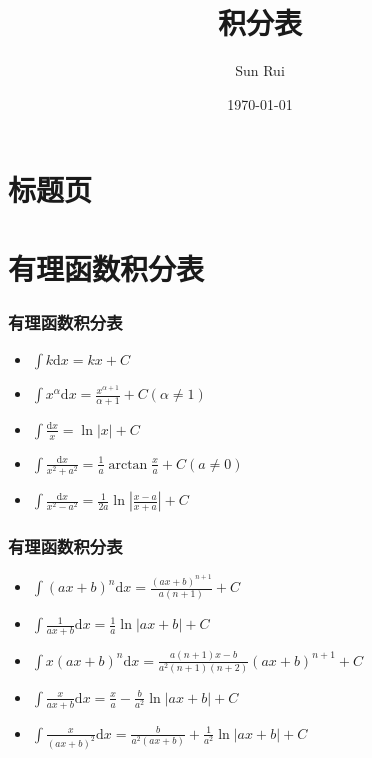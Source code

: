 \documentclass[UTF8, aspectratio = 169, fontsize = 12, hyperref]{ctexbeamer}
\title{积分表}
\author{Sun Rui}
\date{\today}
\begin{document}
    \section{标题页}
    \frame{\maketitle}
    \section{有理函数积分表}
    \begin{frame}
        \frametitle{有理函数积分表}
        \begin{itemize}
            \item $\int{k}\mathrm{d}x=kx+C$
            \item $\int{x^{\alpha}}\mathrm{d}x=\frac{x^{\alpha+1}}{\alpha+1}+C (\alpha \ne 1)$
            \item $\int{\frac{\mathrm{d}x}{x}}=\ln{|x|}+C$
            \item $\int{\frac{\mathrm{d}x}{x^2+a^2}}=\frac{1}{a}\arctan{\frac{x}{a}}+C (a \ne 0)$
            \item $\int{\frac{\mathrm{d}x}{x^2-a^2}}=\frac{1}{2a}\ln{|\frac{x-a}{x+a}|}+C$
        \end{itemize}
    \end{frame}
    \begin{frame}
        \frametitle{有理函数积分表}
        \begin{itemize}
            \item $\int{(ax+b)^n}\mathrm{d}x=\frac{(ax+b)^{n+1}}{a(n+1)}+C$
            \item $\int{\frac{1}{ax+b}}\mathrm{d}x=\frac{1}{a}\ln{|ax+b|}+C$
            \item $\int{x(ax+b)^n}\mathrm{d}x=\frac{a(n+1)x-b}{a^2(n+1)(n+2)}(ax+b)^{n+1}+C$
            \item $\int{\frac{x}{ax+b}}\mathrm{d}x=\frac{x}{a}-\frac{b}{a^2}\ln{|ax+b|}+C$
            \item $\int{\frac{x}{(ax+b)^2}}\mathrm{d}x=\frac{b}{a^2(ax+b)}+\frac{1}{a^2}\ln{|ax+b|}+C$
        \end{itemize}
    \end{frame}
\end{document}
